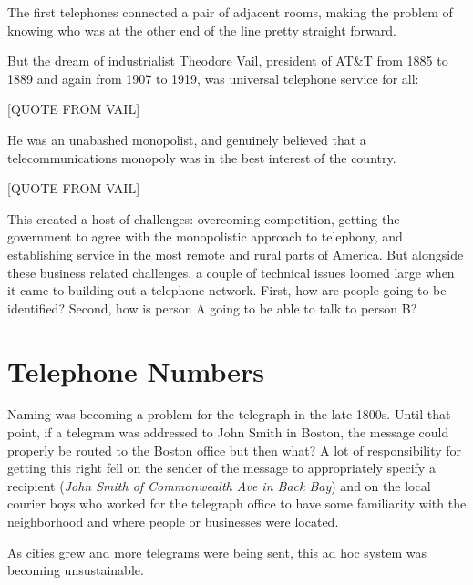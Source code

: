 \documentclass[UTF8]{book}
\begin{document}
\begin{CJK}{UTF8}{gbsn}
The first telephones connected a pair of adjacent rooms, making the problem of knowing who was at the other end of the line pretty straight forward.

But the dream of industrialist Theodore Vail, president of AT\&T from 1885 to 1889 and again from 1907 to 1919, was universal telephone service for all:

[QUOTE FROM VAIL]

He was an unabashed monopolist, and genuinely believed that a telecommunications monopoly was in the best interest of the country.

[QUOTE FROM VAIL]

This created a host of challenges: overcoming competition, getting the government to agree with the monopolistic approach to telephony, and establishing service in the most remote and rural parts of America. But alongside these business related challenges, a couple of technical issues loomed large when it came to building out a telephone network. First, how are people going to be identified? Second, how is person A going to be able to talk to person B?

\section{Telephone Numbers}

Naming was becoming a problem for the telegraph in the late 1800s. Until that point, if a telegram was addressed to John Smith in Boston, the message could properly be routed to the Boston office but then what? A lot of responsibility for getting this right fell on the sender of the message to appropriately specify a recipient (\emph{John Smith of Commonwealth Ave in Back Bay}) and on the local courier boys who worked for the telegraph office to have some familiarity with the neighborhood and where people or businesses were located.

As cities grew and more telegrams were being sent, this ad hoc system was becoming unsustainable.



\end{CJK}
\end{document}
